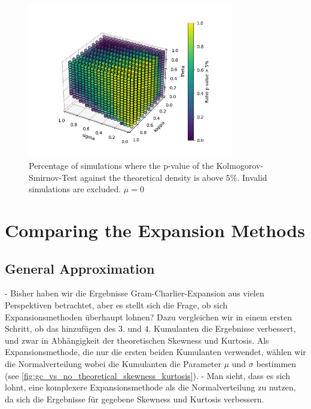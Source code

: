\begin{figure}
    \centering
    \includegraphics[width=0.8\textwidth]{img/GC_cum_KS_3d_p_value_sigma_kappa_theta_muzero.png}
    \caption{Percentage of simulations where the p-value of the Kolmogorov-Smirnov-Test against the theoretical density is above 5\%. Invalid simulations are excluded. $\mu=0$}
    \label{fig:GC_cum_KS_3d_p_value_sigma_kappa_theta_muzero}
\end{figure}

\section{Comparing the Expansion Methods}

\subsection{General Approximation}
- Bisher haben wir die Ergebnisse Gram-Charlier-Expansion aus vielen Perspektiven betrachtet, aber es stellt sich die Frage, ob sich Expansionsmethoden überhaupt lohnen? Dazu vergleichen wir in einem ersten Schritt, ob das hinzufügen des 3. und 4. Kumulanten die Ergebnisse verbessert, und zwar in Abhängigkeit der theoretischen Skewness und Kurtosis. Als Expansionsmethode, die nur die ersten beiden Kumulanten verwendet, wählen wir die Normalverteilung wobei die Kumulanten die Parameter $\mu$ und $\sigma$ bestimmen (see \ref{fig:gc_vs_no_theoretical_skewness_kurtosis}).
- Man sieht, dass es sich lohnt, eine komplexere Expansionsmethode als die Normalverteilung zu nutzen, da sich die Ergebnisse für gegebene Skewness und Kurtosis verbessern.

